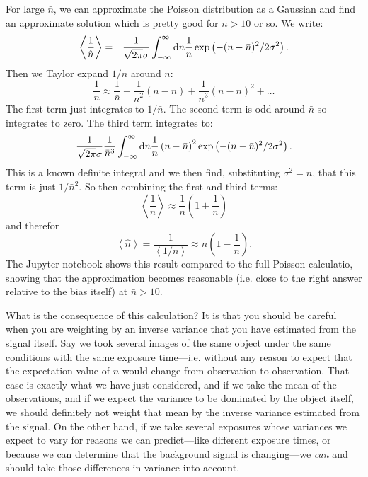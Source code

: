 \begin{enumerate}
\begin{answer}
For large $\bar n$, we can approximate the Poisson distribution as a
Gaussian and find an approximate solution which is pretty good for
$\bar n>10$ or so. We write:
\begin{eqnarray}
\left\langle \frac{1}{\hat n} \right\rangle
&=& \frac{1}{\sqrt{2\pi} \sigma} \int_{-\infty}^{\infty} {\rm
d}n \frac{1}{n} \exp\left(- (n - {\bar n})^2 / 2\sigma^2\right).
\end{eqnarray}
Then we Taylor expand $1/n$ around $\bar n$:
\begin{equation}
\frac{1}{n} \approx \frac{1}{\bar n}
- \frac{1}{{\bar n}^2}\left(n - {\bar n}\right)
+ \frac{1}{{\bar n}^3}\left(n - {\bar n}\right)^2 + \ldots
\end{equation}
The first term just integrates to $1/{\bar n}$. The second term is odd
around ${\bar n}$ so integrates to zero. The third term integrates to:
\begin{equation}
\frac{1}{\sqrt{2\pi} \sigma} \frac{1}{{\bar n}^3} 
\int_{-\infty}^{\infty} {\rm d}n \frac{1}{n} \left(n - {\bar
n}\right)^2 \exp\left(- (n - {\bar n})^2 / 2\sigma^2\right).
\end{equation}
This is a known definite integral and we then find, substituting
$\sigma^2 = {\bar n}$, that this term is just $1/{\bar n}^2$. So then
combining the first and third terms:
\begin{equation}
\left\langle \frac{1}{\hat n} \right\rangle \approx \frac{1}{\bar
n} \left(1 + \frac{1}{\bar n}\right)
\end{equation}
and therefor
\begin{equation}
\left\langle {\hat n} \right\rangle
= \frac{1}{\left\langle 1/n\right\rangle} \approx {\bar n}
\left(1 - \frac{1}{\bar n}\right).
\end{equation}
The Jupyter notebook shows this result compared to the full Poisson
calculatio, showing that the approximation becomes reasonable
(i.e. close to the right answer relative to the bias itself) at ${\bar
n} > 10$.

What is the consequence of this calculation? It is that you should be
careful when you are weighting by an inverse variance that you have
estimated from the signal itself. Say we took several images of the
same object under the same conditions with the same exposure
time---i.e. without any reason to expect that the expectation value of
$n$ would change from observation to observation. That case is exactly
what we have just considered, and if we take the mean of the
observations, and if we expect the variance to be dominated by the
object itself, we should definitely not weight that mean by the
inverse variance estimated from the signal.  On the other hand, if we
take several exposures whose variances we expect to vary for reasons
we can predict---like different exposure times, or because we can
determine that the background signal is changing---we {\it can} and
should take those differences in variance into account.
\end{answer}
\end{enumerate}

